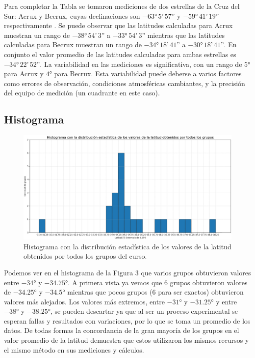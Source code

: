 \documentclass[11pt, a4paper]{article} %
\begin{document}
Para completar la Tabla se tomaron mediciones de dos estrellas de la Cruz del Sur: Acrux y Becrux, cuyas declinaciones son $-\ang{63} \,5\text{'}\, 57\text{''}$ y $-\ang{59} \, 41\text{'}\, 19\text{''}$ respectivamente \cite{buenosairesPlanetarioGalileo}. Se puede observar que las latitudes calculadas para Acrux muestran un rango de $-\ang{38} \,54\text{'}\, 3\text{''}$ a $-\ang{33} \,54\text{'}\, 3\text{''}$ mientras que las latitudes calculadas para Becrux muestran un rango de $-\ang{34} \,18\text{'}\, 41\text{''}$ a $-\ang{30} \,18\text{'}\, 41\text{''}$. En conjunto el valor promedio de las latitudes calculadas para ambas estrellas es $-\ang{34} \,22\text{'}\, 52\text{''}$. La variabilidad en las mediciones es significativa, con un rango de $\ang{5}$ para Acrux y $\ang{4}$ para Becrux. Esta variabilidad puede deberse a varios factores como errores de observación, condiciones atmosféricas cambiantes, y la precisión del equipo de medición (un cuadrante en este caso).

\subsection{Histograma}
\begin{figure}[H]
    \centering
    \includegraphics[width=15cm]{images/histograma.png}
    \caption{Histograma con la distribución estadística de los valores de la latitud obtenidos por todos los grupos del curso.}
    \label{fig:histograma}
\end{figure}

Podemos ver en el histograma de la Figura 3 que varios grupos obtuvieron valores entre $-\ang{34}$ y $-\ang{34.75}$. A primera vista ya vemos que 6 grupos obtuvieron valores de $-\ang{34.25}$ y $-\ang{34.5}$ mientras que pocos grupos (6 para ser exactos) obtuvieron valores más alejados. Los valores más extremos, entre $-\ang{31}$ y $-\ang{31.25}$ y entre $-\ang{38}$ y $-\ang{38.25}$, se pueden descartar ya que al ser un proceso experimental se esperan fallas y resultados con variaciones, por lo que se toma un promedio de los datos. De todas formas la concordancia de la gran mayoría de los grupos en el valor promedio de la latitud demuestra que estos utilizaron los mismos recursos y el mismo método en sus mediciones y cálculos. 
\end{document}
